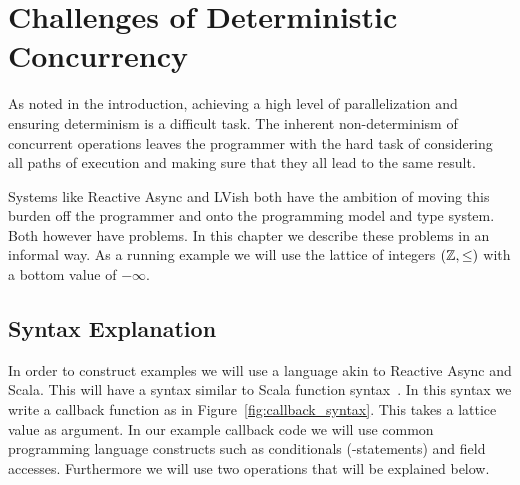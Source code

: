 \chapter{Challenges of Deterministic Concurrency}
\label{cha:challenges}





As noted in the introduction, achieving a high level of parallelization and
ensuring determinism is a difficult task. The inherent non-determinism of
concurrent operations leaves the programmer with the hard task of considering
all paths of execution and making sure that they all lead to the same result.

Systems like Reactive Async and LVish both have the ambition of moving this
burden off the programmer and onto the programming model and type system. Both
however have problems. In this chapter we describe these problems in an informal
way. As a running example we will use the lattice of integers $(\mathbb{Z},
\leq)$ with a bottom value of $-\infty$.


\section{Syntax Explanation}%
\label{sec:operations}

In order to construct examples we will use a language akin to Reactive Async and
Scala. This will have a syntax similar to Scala function
syntax~\parencite{scalabasics}. In this syntax we write a callback function as in
Figure~\ref{fig:callback_syntax}. This takes a lattice value  as
argument. In our example callback code we will use common programming language
constructs such as conditionals (-statements) and field accesses.
Furthermore we will use two operations that will be explained below.

